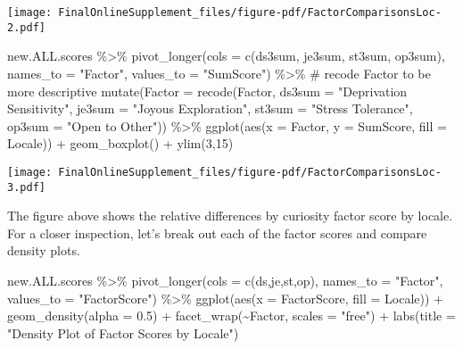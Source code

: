\documentclass[
  letterpaper,
  DIV=11,
  numbers=noendperiod]{scrartcl}
\newenvironment{Shaded}{\begin{snugshade}}{\end{snugshade}}
\newcommand{\AttributeTok}[1]{\textcolor[rgb]{0.40,0.45,0.13}{#1}}
\newcommand{\CommentTok}[1]{\textcolor[rgb]{0.37,0.37,0.37}{#1}}
\newcommand{\DecValTok}[1]{\textcolor[rgb]{0.68,0.00,0.00}{#1}}
\newcommand{\FloatTok}[1]{\textcolor[rgb]{0.68,0.00,0.00}{#1}}
\newcommand{\FunctionTok}[1]{\textcolor[rgb]{0.28,0.35,0.67}{#1}}
\newcommand{\NormalTok}[1]{\textcolor[rgb]{0.00,0.23,0.31}{#1}}
\newcommand{\SpecialCharTok}[1]{\textcolor[rgb]{0.37,0.37,0.37}{#1}}
\newcommand{\StringTok}[1]{\textcolor[rgb]{0.13,0.47,0.30}{#1}}
\begin{document}
\texttt{[image: FinalOnlineSupplement\_files/figure-pdf/FactorComparisonsLoc-2.pdf]}

\begin{Shaded}
\begin{Highlighting}[]
\NormalTok{new.ALL.scores }\SpecialCharTok{\%\textgreater{}\%}
  \FunctionTok{pivot\_longer}\NormalTok{(}\AttributeTok{cols =} \FunctionTok{c}\NormalTok{(ds3sum, je3sum, st3sum, op3sum), }
               \AttributeTok{names\_to =} \StringTok{"Factor"}\NormalTok{, }
               \AttributeTok{values\_to =} \StringTok{"SumScore"}\NormalTok{) }\SpecialCharTok{\%\textgreater{}\%}
  \CommentTok{\# recode Factor to be more descriptive}
  \FunctionTok{mutate}\NormalTok{(}\AttributeTok{Factor =} \FunctionTok{recode}\NormalTok{(Factor, }
                         \AttributeTok{ds3sum =} \StringTok{"Deprivation Sensitivity"}\NormalTok{, }
                         \AttributeTok{je3sum =} \StringTok{"Joyous Exploration"}\NormalTok{, }
                         \AttributeTok{st3sum =} \StringTok{"Stress Tolerance"}\NormalTok{, }
                         \AttributeTok{op3sum =} \StringTok{"Open to Other"}\NormalTok{)) }\SpecialCharTok{\%\textgreater{}\%}
  \FunctionTok{ggplot}\NormalTok{(}\FunctionTok{aes}\NormalTok{(}\AttributeTok{x =}\NormalTok{ Factor, }
             \AttributeTok{y =}\NormalTok{ SumScore, }
             \AttributeTok{fill =}\NormalTok{ Locale)) }\SpecialCharTok{+}
  \FunctionTok{geom\_boxplot}\NormalTok{() }\SpecialCharTok{+}
  \FunctionTok{ylim}\NormalTok{(}\DecValTok{3}\NormalTok{,}\DecValTok{15}\NormalTok{)}
\end{Highlighting}
\end{Shaded}

\texttt{[image: FinalOnlineSupplement\_files/figure-pdf/FactorComparisonsLoc-3.pdf]}

The figure above shows the relative differences by curiosity factor
score by locale. For a closer inspection, let's break out each of the
factor scores and compare density plots.

\begin{Shaded}
\begin{Highlighting}[]
\NormalTok{new.ALL.scores }\SpecialCharTok{\%\textgreater{}\%}
  \FunctionTok{pivot\_longer}\NormalTok{(}\AttributeTok{cols =} \FunctionTok{c}\NormalTok{(ds,je,st,op), }
               \AttributeTok{names\_to =} \StringTok{"Factor"}\NormalTok{, }
               \AttributeTok{values\_to =} \StringTok{"FactorScore"}\NormalTok{) }\SpecialCharTok{\%\textgreater{}\%}
  \FunctionTok{ggplot}\NormalTok{(}\FunctionTok{aes}\NormalTok{(}\AttributeTok{x =}\NormalTok{ FactorScore, }
             \AttributeTok{fill =}\NormalTok{ Locale)) }\SpecialCharTok{+}
  \FunctionTok{geom\_density}\NormalTok{(}\AttributeTok{alpha =} \FloatTok{0.5}\NormalTok{) }\SpecialCharTok{+}
  \FunctionTok{facet\_wrap}\NormalTok{(}\SpecialCharTok{\textasciitilde{}}\NormalTok{Factor, }\AttributeTok{scales =} \StringTok{"free"}\NormalTok{) }\SpecialCharTok{+}
  \FunctionTok{labs}\NormalTok{(}\AttributeTok{title =} \StringTok{"Density Plot of Factor Scores by Locale"}\NormalTok{)}
\end{Highlighting}
\end{Shaded}
\end{document}
